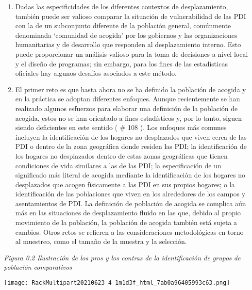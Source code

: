 \documentclass[
]{book}
\begin{document}
\begin{enumerate}
\item
  Dadas las especificidades de los diferentes contextos de desplazamiento, también puede ser valioso comparar la situación de vulnerabilidad de las PDI con la de un subconjunto diferente de la población general, comúnmente denominada `comunidad de acogida' por los gobiernos y las organizaciones humanitarias y de desarrollo que responden al desplazamiento interno. Esto puede proporcionar un análisis valioso para la toma de decisiones a nivel local y el diseño de programas; sin embargo, para los fines de las estadísticas oficiales hay algunos desafíos asociados a este método.
\item
  El primer reto es que hasta ahora no se ha definido la población de acogida y en la práctica se adoptan diferentes enfoques. Aunque recientemente se han realizado algunos esfuerzos para elaborar una definición de la población de acogida, estos no se han orientado a fines estadísticos y, por lo tanto, siguen siendo deficientes en este sentido (
  \# 108
  ). Los enfoques más comunes incluyen la identificación de los hogares no desplazados que viven cerca de las PDI o dentro de la zona geográfica donde residen las PDI; la identificación de los hogares no desplazados dentro de estas zonas geográficas que tienen condiciones de vida similares a las de las PDI; la especificación de un significado más literal de acogida mediante la identificación de los hogares no desplazados que acogen físicamente a las PDI en sus propios hogares; o la identificación de las poblaciones que viven en los alrededores de los campos y asentamientos de PDI. La definición de población de acogida se complica aún más en las situaciones de desplazamiento fluido en las que, debido al propio movimiento de la población, la población de acogida también está sujeta a cambios. Otros retos se refieren a las consideraciones metodológicas en torno al muestreo, como el tamaño de la muestra y la selección.
\end{enumerate}

\emph{Figura 0.2 Ilustración de los pros y los contras de la identificación de grupos de población comparativos}

\texttt{[image: RackMultipart20210623-4-1m1d3f\_html\_7ab0a96405993c63.png]}
\end{document}
